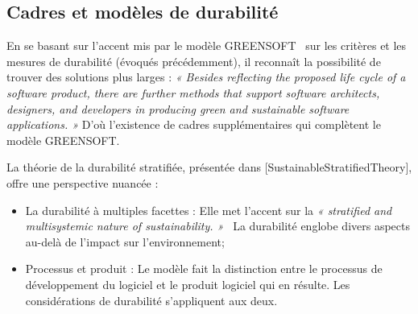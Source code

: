 
\subsection{Cadres et modèles de durabilité}
En se basant sur l'accent mis par le modèle GREENSOFT~\cite{GreenSoftModel} sur les critères et les mesures de durabilité (évoqués précédemment), il reconnaît la possibilité de trouver des solutions plus larges : \emph{« Besides reflecting the proposed life cycle of a software product, there are further methods that support software architects, designers, and developers in producing green and sustainable software applications. »} D'où l'existence de cadres supplémentaires qui complètent le modèle GREENSOFT.


La théorie de la durabilité stratifiée, présentée dans [SustainableStratifiedTheory], offre une perspective nuancée :
\begin{itemize}
    \item La durabilité à multiples facettes : Elle met l'accent sur la \emph{« stratified and multisystemic nature of sustainability. »}~\cite{SustainableStratifiedTheory} La durabilité englobe divers aspects au-delà de l'impact sur l'environnement;
    \item Processus et produit : Le modèle fait la distinction entre le processus de développement du logiciel et le produit logiciel qui en résulte. Les considérations de durabilité s'appliquent aux deux.
\end{itemize}


